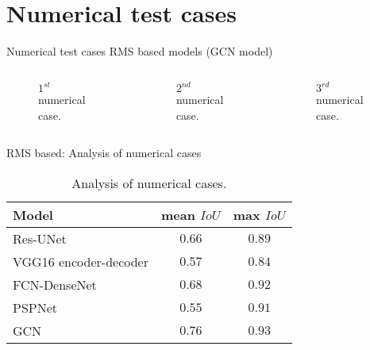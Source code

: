 \documentclass[10pt,aspectratio=169,dvipsnames]{beamer} %
\begin{document}
		\section{Numerical test cases}
		\begin{frame}{Numerical test cases RMS based models (GCN model)}
			\begin{columns}[T]
				\begin{column}[c]{0.32\textwidth}
					\begin{figure}[c]
						\centering
						\caption{\(1^{st}\) numerical case.}
					\end{figure}
				\end{column}
				\hfill
				\begin{column}[c]{0.32\textwidth}
					\begin{figure}[c]
						\centering
						\caption{\(2^{nd}\) numerical case.}
					\end{figure}
				\end{column}
				\hfill
				\begin{column}[c]{0.32\textwidth}
					\begin{figure}[c]
						\centering
						\caption{\(3^{rd}\) numerical case.}
					\end{figure}
				\end{column}
			\end{columns}
		\end{frame}
		\begin{frame}{RMS based: Analysis of numerical cases}
			\begin{table}[ht!]
				\centering
				\caption{Analysis of numerical cases.}
				\label{tab:table_all_numerical_cases}	
				\begin{tabular}{lcc}
					\toprule
					Model & mean \(IoU\) & max \(IoU\) \\ 
					\midrule 
					Res-UNet & \(0.66\) & \(0.89\) \\ 
					VGG16 encoder-decoder & \(0.57\) & \(0.84\) \\ 
					FCN-DenseNet & \(0.68\) & \(0.92\) \\ 
					PSPNet & \(0.55\) & \(0.91\) \\ 
					GCN & \(0.76\) & \(0.93\) \\ 
					\bottomrule
				\end{tabular}
			\end{table}
		\end{frame}
\end{document}
